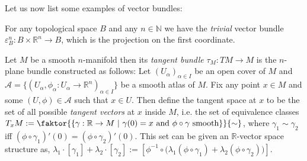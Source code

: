 Let us now list some examples of vector bundles:
\begin{examples}\label{ex:vector_bundles}
\begin{i_enum}
\item For any topological space $B$ and any $n\in\mathbb{N}$ we have the \emph{trivial} vector bundle
$\varepsilon_B^n:B\times\mathbb{R}^n\to B$,
which is the projection on the first coordinate.
\item Let $M$ be a smooth $n$-manifold then its \emph{tangent bundle} $\tau_M:TM\to M$ is the $n$-plane bundle constructed as follows: Let $(U_{\alpha})_{\alpha\in I}$ be an open cover of $M$ and $\mathcal{A}=\big\{(U_{\alpha},\phi_{\alpha}:U_{\alpha}\to\mathbb{R}^n)_{\alpha\in I}\big\}$ be a smooth atlas of $M$. Fix any point $x\in M$ and some $(U,\phi)\in\mathcal{A}$ such that $x\in U$. Then define the tangent space at $x$ to be the set of all possible \emph{tangent vectors} at $x$ inside $M$, i.e. the set of equivalence classes
$T_xM:=\faktor{\left\{\gamma:\mathbb{R}\to M\ |\ \gamma(0)=x\text{ and }\phi\circ\gamma\text{ smooth}\right\}}{\sim}$,
where $\gamma_1\sim\gamma_2$ iff $(\phi\circ\gamma_1)'(0)=(\phi\circ\gamma_2)'(0)$. This set can be given an $\mathbb{R}$-vector space structure as,
$\lambda_1\cdot[\gamma_1]+\lambda_2\cdot[\gamma_2]:=\left[\phi^{-1}\circ\big(\lambda_1(\phi\circ\gamma_1)+\lambda_2(\phi\circ\gamma_2)\big)\right]$.


\end{i_enum}
\end{examples}
